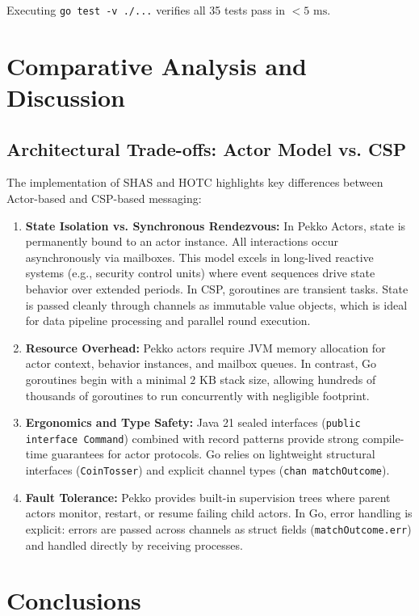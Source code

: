 \documentclass[11pt,a4paper]{article}
\begin{document}
Executing \texttt{go test -v ./...} verifies all 35 tests pass in $< 5\text{ ms}$.

\section{Comparative Analysis and Discussion}

\subsection{Architectural Trade-offs: Actor Model vs. CSP}

The implementation of SHAS and HOTC highlights key differences between Actor-based and CSP-based messaging:

\begin{enumerate}[leftmargin=*]
    \item \textbf{State Isolation vs. Synchronous Rendezvous:} In Pekko Actors, state is permanently bound to an actor instance. All interactions occur asynchronously via mailboxes. This model excels in long-lived reactive systems (e.g., security control units) where event sequences drive state behavior over extended periods. In CSP, goroutines are transient tasks. State is passed cleanly through channels as immutable value objects, which is ideal for data pipeline processing and parallel round execution.
    \item \textbf{Resource Overhead:} Pekko actors require JVM memory allocation for actor context, behavior instances, and mailbox queues. In contrast, Go goroutines begin with a minimal $2\text{ KB}$ stack size, allowing hundreds of thousands of goroutines to run concurrently with negligible footprint.
    \item \textbf{Ergonomics and Type Safety:} Java 21 sealed interfaces (\texttt{public interface Command}) combined with record patterns provide strong compile-time guarantees for actor protocols. Go relies on lightweight structural interfaces (\texttt{CoinTosser}) and explicit channel types (\texttt{chan matchOutcome}).
    \item \textbf{Fault Tolerance:} Pekko provides built-in supervision trees where parent actors monitor, restart, or resume failing child actors. In Go, error handling is explicit: errors are passed across channels as struct fields (\texttt{matchOutcome.err}) and handled directly by receiving processes.
\end{enumerate}

\section{Conclusions}
\end{document}
